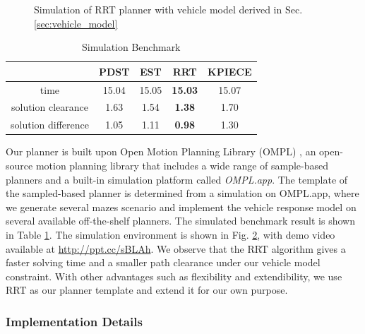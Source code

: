 \documentclass[../thesis.tex]{subfiles}
\begin{document}
\begin{figure}[t]
\begin{subfigure}[b]{0.3\linewidth}
		\subcaption{}
		\label{fig:rrt-sim-maze2}
	\end{subfigure}
	\caption{Simulation of RRT planner with vehicle model derived in Sec. \ref{sec:vehicle_model}}
    \label{fig:rrt-sim-maze}
\end{figure}


\begin{table}[t]
	\centering
	\caption{Simulation Benchmark}
	\label{table:simulation-benchmark}
	\begin{small}
	\begin{sc}
	\begin{tabular}{ccccc}
		\toprule 
			& PDST \cite{ladd2005motion} & EST \cite{hsu1997path} & RRT \cite{kuffner2000rrt} & KPIECE \cite{csucan2009kinodynamic} \\
		\midrule \midrule
		time & 15.04 & 15.05 & \textbf{15.03} & 15.07 \\
		solution clearance & 1.63 & 1.54 & \textbf{1.38} & 1.70 \\
		solution difference & 1.05 & 1.11 & \textbf{0.98} & 1.30 \\
		\toprule
	\end{tabular}
	\end{sc}
	\end{small}
\end{table}

Our planner is built upon Open Motion Planning Library (OMPL) \cite{sucan2012the-open-motion-planning-library}, an open-source motion planning library that includes a wide range of sample-based planners and a built-in simulation platform called \textit{OMPL.app}. 
The template of the sampled-based planner is determined from a simulation on OMPL.app, where we generate several mazes scenario and implement the vehicle response model on several available off-the-shelf planners. The simulated benchmark result is shown in Table \ref{table:simulation-benchmark}. The simulation environment is shown in Fig. \ref{fig:rrt-sim-maze}, with demo video available at \url{http://ppt.cc/sBLAh}. We observe that the RRT algorithm gives a faster solving time and a smaller path clearance under our vehicle model constraint. With other advantages such as flexibility and extendibility, we use RRT as our planner template and extend it for our own purpose.


\subsubsection{Implementation Details}
\end{document}
